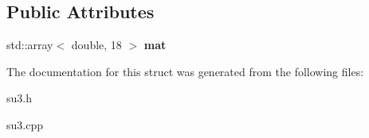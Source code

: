 \subsection*{Public Attributes}
\begin{DoxyCompactItemize}
\item 
std\+::array$<$ double, 18 $>$ {\bfseries mat}\hypertarget{structSU3_acf8e4278a5ad59ae35c0c6cbc1e81685}{}\label{structSU3_acf8e4278a5ad59ae35c0c6cbc1e81685}

\end{DoxyCompactItemize}


The documentation for this struct was generated from the following files\+:\begin{DoxyCompactItemize}
\item 
su3.\+h\item 
su3.\+cpp\end{DoxyCompactItemize}
